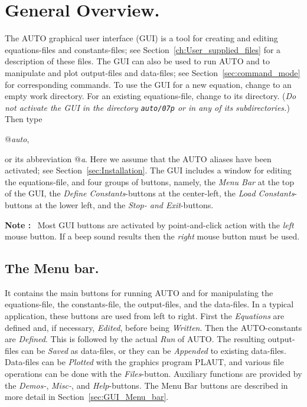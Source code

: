 \documentclass[12pt]{report}
\begin{document}
\section{ General Overview.} \label{sec:GUI_Overview}
The {\cal AUTO} graphical user interface (GUI) is a tool
for creating and editing equations-files and constants-files;
see Section~\ref{ch:User_supplied_files}
 for a description of these files.
The GUI can also be used to run {\cal AUTO} and to manipulate and plot
output-files and data-files; 
see Section~\ref{sec:command_mode} for corresponding commands.
To use the GUI for a new equation, change to an empty work directory.
For an existing equations-file, change to its directory.
({\it Do not activate the GUI in the directory {\tt auto/07p} 
or in any of its subdirectories.})
Then type 

\centerline { @{\it auto}, }

or its abbreviation @{\it a}.
Here we assume that the {\cal AUTO} aliases have been activated; 
see Section~\ref{sec:Installation}.
The GUI includes a window for editing the equations-file,
and four groups of buttons, namely,
the {\it Menu Bar} at the top of the GUI,
the {\it Define Constants}-buttons at the center-left,
the {\it Load Constants}-buttons at the lower left,
and the {\it Stop- and Exit}-buttons.

{\bf Note :}~
Most GUI buttons are activated by point-and-click action with 
the {\it left} mouse button. 
If a beep sound results then the {\it right} mouse button must be used. 

\subsection{ The Menu bar.}
It contains the main buttons for running {\cal AUTO}
and for manipulating the equations-file, the constants-file,
the output-files, and the data-files.
In a typical application, these buttons are used from left to right.
First the {\it Equations} are defined and, if necessary, {\it Edited},
before being {\it Written}.
Then the {\cal AUTO}-constants are {\it Defined}.
This is followed by the actual {\it Run} of {\cal AUTO}.
The resulting output-files can be {\it Saved} as data-files,
or they can be {\it Appended} to existing data-files.
Data-files can be {\it Plotted} with the graphics program {\cal PLAUT},
and various file operations can be done with the {\it Files}-button.
Auxiliary functions are provided by the {\it Demos-}, {\it Misc-},
and {\it Help}-buttons.
The Menu Bar buttons are described in more detail 
in Section~\ref{sec:GUI_Menu_bar}.
\end{document}
